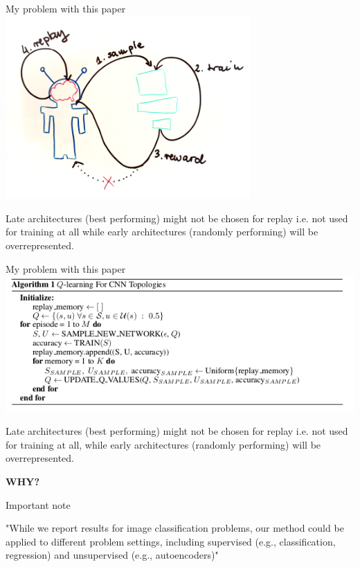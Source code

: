 \documentclass[15pt]{beamer}
\begin{document}
\begin{frame}{My problem with this paper}
  \centering
  \includegraphics[width=0.7\textwidth]{model.png}
  
  \raggedright
  Late architectures (best performing) might not be chosen for replay i.e. not used for  training at all while early architectures (randomly performing) will be overrepresented.
\end{frame}

\begin{frame}{My problem with this paper}
\includegraphics[width=\textwidth]{algorithm-1.png}

Late architectures (best performing) might not be chosen for replay i.e. not used for training at all, while early architectures (randomly performing) will be overrepresented.

\vskip0.1in
\begin{center}
\textbf{WHY?}
\end{center}
\end{frame}


\begin{frame}{Important note}
  \begin{center}
  \Huge{\faLightbulbO}
\end{center}

"While we report results for image classification problems, our method could be applied to different problem settings, including supervised (e.g., classification, regression) and unsupervised (e.g., autoencoders)"
\end{frame}
\end{document}

